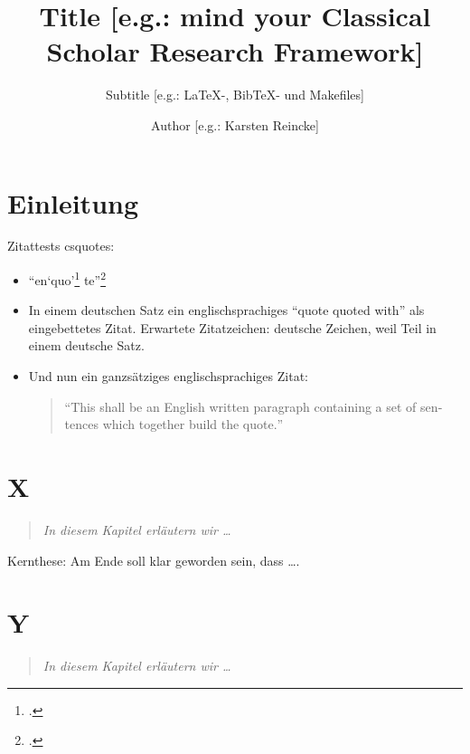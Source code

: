 \documentclass[
  DIV=calc,
  BCOR=5mm,
  11pt,
  headings=small,
  oneside,
  abstract=true,
  toc=bib,
  english,ngerman]{scrbook}
\begin{document}
\nocite{*}

\titlehead{Z.B.Geisteswissenschftliche Forschungsarbeit}
\subject{Topic [e.g.: myCsrf-]}
\title{Title [e.g.: mind your Classical Scholar Research Framework]}
\subtitle{Subtitle [e.g.: LaTeX-, BibTeX- und Makefiles]}
\author{Author [e.g.: Karsten Reincke]}
\maketitle

\footnotesize
\tableofcontents

\normalsize
\chapter{Einleitung}
Zitattests csquotes: 

\begin{itemize}
  \item \enquote{en\enquote{quo}\footcite[vgl.][15]{AllHen2008a}
te}\footcite[vgl.][15]{AllHen2008a}

  \item In einem deutschen Satz ein englischsprachiges
  \foreignquote{english}{quote quoted with} als eingebettetes Zitat. Erwartete
  Zitatzeichen: deutsche Zeichen, weil Teil in einem deutsche Satz.
  
  \item Und nun ein ganzsätziges englischsprachiges Zitat:
  \begin{quote}
    \foreignquote{english}{This shall be an English written paragraph containing
    a set of sentences which together build the quote.}
  \end{quote}
  
\end{itemize}

\chapter{X}
\begin{quote}\itshape
In diesem Kapitel erläutern wir \ldots
\end{quote} 

Kernthese: Am Ende soll klar geworden sein, dass \ldots.

\chapter{Y}
\begin{quote}\itshape
In diesem Kapitel erläutern wir \ldots
\end{quote} 
\end{document}

